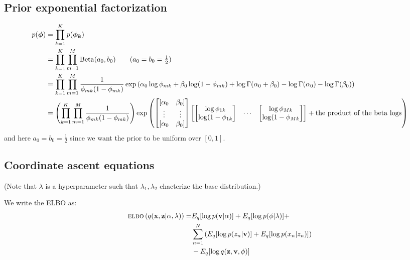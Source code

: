 \documentclass[11pt]{article}
\newcommand{\bx}{\ensuremath{\mathbf{x}}}
\newcommand{\bz}{\ensuremath{\mathbf{z}}}
\newcommand{\ELBO}{\textsc{elbo}}
\begin{document}
\subsection{Prior exponential factorization}
\vspace{-0.5cm}
\begin{align}
p(\bm{\phi}) &= \prod\limits_{k=1}^K p(\bm{\phi_k}) \nonumber \\
			&= \prod\limits_{k=1}^K \prod\limits_{m=1}^M \mathrm{Beta}(a_0, b_0) \tag{$a_0 = b_0 = \frac{1}{2}$} \\
			&= \prod\limits_{k=1}^K \prod\limits_{m=1}^M \frac{1}{\phi_{mk}(1 - \phi_{mk})} \exp\left(\alpha_0 \log\phi_{mk} + \beta_0 \log(1 - \phi_{mk}) + \log \Gamma(\alpha_0 + \beta_0) - \log \Gamma(\alpha_0) - \log\Gamma(\beta_0)\right) \nonumber \\
			&= \left(\prod\limits_{k=1}^K \prod\limits_{m=1}^M \frac{1}{\phi_{mk}(1 - \phi_{mk})} \right) \exp\left(
			\begin{bmatrix}
				[\alpha_0 & \beta_0] \\
				\vdots &\vdots \\
				[\alpha_0 & \beta_0]
			\end{bmatrix}
			\begin{bmatrix}
				\begin{bmatrix}
				 \log\phi_{1k} \\ \log(1 - \phi_{1k} 
				\end{bmatrix} & \cdots &
				\begin{bmatrix}
				 \log\phi_{Mk} \\ \log(1 - \phi_{Mk} 
				\end{bmatrix}
			\end{bmatrix}
			+ \text{the product of the beta logs}
			\right)
\end{align}
and here $a_0 = b_0 = \frac{1}{2}$ since we want the prior to be uniform over $[0,1]$.

\subsection{Coordinate ascent equations}

 (Note that $\lambda$ is a hyperparameter such that $\lambda_1, \lambda_2$ chacterize the base distribution.)

We write the ELBO as:
\begin{equation}
	\begin{split}
		\ELBO\left(q(\bx, \bz | \alpha, \lambda)\right) = &E_q[\log p(\mathbf{v} | \alpha)] + E_q[ \log p(\mathbf{\phi} | \lambda)] + \\ &\sum\limits_{n=1}^N \left( E_q[\log p(z_n | \mathbf{v})] + E_q[\log p(x_n | z_n)]\right) \\  &- E_q[\log q(\bz, \mathbf{v}, \mathbf{\phi})]
	\end{split}
\end{equation}
 
\end{document}
